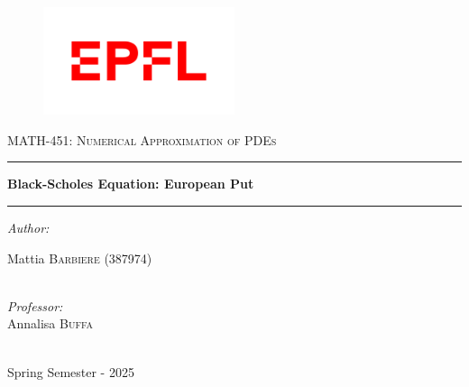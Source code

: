 \documentclass{article}
\begin{document}
\thispagestyle{empty}

\begin{figure}
\centering
\includegraphics[width=0.5\textwidth]{code/images/LOGO.png}
\end{figure}
\vspace{0.5cm}
\begin{center}
\textsc{ \Large MATH-451: Numerical Approximation of PDEs}
\vspace{1.5cm}
\hrule
\vspace{0.5cm}
{\huge \bfseries Black-Scholes Equation: European Put}
\vspace{0.5cm}
\hrule
\vspace{1.5cm}


\emph{\Large \centering Author:}\\
\vspace{0.3cm}

\large Mattia \textsc{\large Barbiere} (387974)\\

~

\vspace{0.5cm}


\emph{\Large \centering Professor:}\\
\vspace{0.3cm}
\large  Annalisa  \textsc{\large Buffa}\\
~

\vspace{0.5cm}

\large Spring Semester - 2025

\end{center}

\clearpage
{} 
\end{document}
